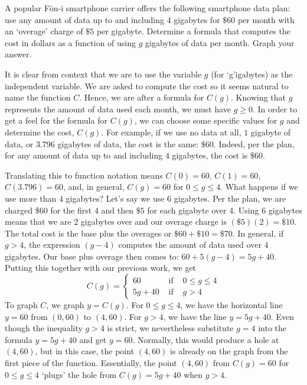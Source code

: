 \documentclass{ximera}
\begin{document}
\begin{example}  \label{dataplanex} A popular F\={o}n-i smartphone carrier offers the following smartphone data plan: use any amount of data up to and including 4 gigabytes for $\$ 60$ per month with an `overage' charge of $ \$5$ per gigabyte.  Determine a formula that computes the cost in dollars as a function of using $g$ gigabytes of data per month. Graph your answer.

\begin{explanation}  
It is clear from context that we are to use the variable $g$ (for `g'igabytes) as the independent variable.  We are asked to compute the cost so it seems natural to name the function $C$.  Hence, we are after a formula for $C(g)$.  Knowing that $g$ represents the amount of data used each month, we must have $g \geq 0$.  In order to get a feel for the formula for $C(g)$, we can choose some specific values for $g$ and determine the cost, $C(g)$.  For example, if we use no data at all, $1$ gigabyte of data,  or $3.796$ gigabytes of data, the cost is the same:  $\$60$.  Indeed, per the plan, for any amount of data up to and including $4$ gigabytes, the cost is $\$60$.  



Translating this to function notation means $C(0) = 60$, $C(1) = 60$, $C(3.796) = 60$, and, in general, $C(g) = 60$ for  $0 \leq g \leq 4$.  What happens if we use more than $4$ gigabytes?  Let's say we use $6$ gigabytes.  Per the plan, we are charged $\$60$ for the first $4$ and then $\$5$ for each gigabyte over $4$.  Using $6$ gigabytes means that we are $2$ gigabytes over and our overage charge is $ (\$ 5)(2) = \$ 10$.  The total cost is the base plus the overages or $\$60 + \$10 = \$70$.  In general, if $g>4$, the expression $(g-4)$ computes the amount of data used over $4$ gigabytes.  Our base plus overage then comes to: $60 + 5(g-4) = 5g+40$.  Putting this together with our previous work, we get
\[C(g) = \left\{ \begin{array}{rcl}  60 & \mbox{ if } & 0 \leq g \leq 4 \\
5g+40 & \mbox{ if } & g > 4
 \end{array} \right.\]
To graph $C$, we graph $y = C(g)$.  For $0 \leq g \leq 4$, we have the horizontal line $y = 60$ from $(0,60)$ to $(4,60)$.  For $g>4$, we have the line $y = 5g+ 40$.  Even though the inequality $g > 4$ is strict, we nevertheless substitute $g = 4$ into the formula $y = 5g + 40$ and get $y = 60$.  Normally, this would produce a hole at $(4, 60)$, but in this case, the point $(4, 60)$ is already on the graph from the first piece of the function.  Essentially, the point $(4,60)$ from $C(g) = 60$ for $0 \leq g \leq 4$ `plugs' the hole from $C(g) = 5g + 40$ when $g> 4$.   




\end{explanation}
\end{example}
\end{document}
